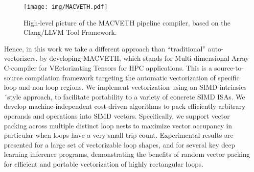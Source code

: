 \begin{figure*}
	\centering
	\texttt{[image: img/MACVETH.pdf]}
	\caption{High-level picture of the MACVETH pipeline compiler, based on the 
		Clang/LLVM Tool Framework.}
	\label{fig:MACVETHarch}
\end{figure*}

Hence, in this work we take a different approach than ``traditional'' 
auto-vectorizers, by developing MACVETH, which 
stands 
for Multi-dimensional Array C-compiler for
VEctorizating Tensors for HPC applications. This is a 
source-to-source compilation framework targeting the automatic vectorization 
of 
specific loop and non-loop regions. We implement vectorization using an 
SIMD-intrinsics ´style 
approach, to facilitate portability to a variety of concrete SIMD ISAs. We 
develop machine-independent cost-driven algorithms to pack efficiently 
arbitrary operands and operations into SIMD vectors. Specifically, we support 
vector packing across multiple distinct loop nests to maximize vector 
occupancy 
in particular when loops have a very small trip count. Experimental results 
are 
presented for a large set of vectorizable loop shapes, and for several key 
deep 
learning inference programs, demonstrating the benefits of random vector 
packing for efficient and portable vectorization of highly rectangular loops.
